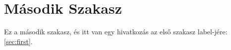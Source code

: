 \section{Második Szakasz}
\label{sec:second}

Ez a második szakasz, és itt van egy hivatkozás az első szakasz label-jére: \ref{sec:first}.

\lipsum[3]